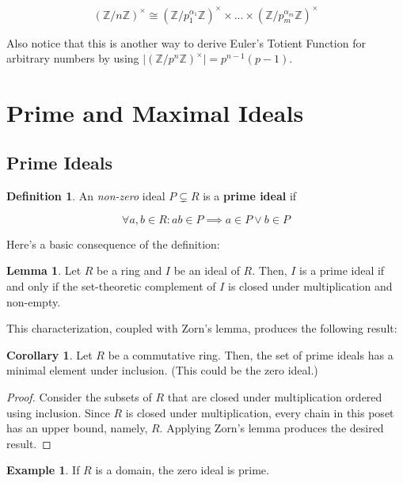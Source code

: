 \documentclass{article}
\theoremstyle{definition}
\newtheorem{definition}{Definition}
\newtheorem{lemma}[theorem]{Lemma}
\newtheorem{corollary}{Corollary}[theorem]
\newtheorem{example}[theorem]{Example}
\newcommand{\Z}{\mathbb{Z}}
\begin{document}
\[ (\Z / n\Z)^{\times} \cong  (\Z / p_{1}^{\alpha_{1}}\Z)^{\times} \times ... \times (\Z / p_{m}^{\alpha_{m}}\Z)^{\times}\]

Also notice that this is another way to derive Euler's Totient Function for
arbitrary numbers by using  $\lvert (\Z / p^{n}\Z)^{\times} \rvert = p^{n-1}(p - 1)$.



\newpage

\section{Prime and Maximal Ideals}

\subsection{Prime Ideals}

\begin{definition}
    An \textit{non-zero} ideal $P \subsetneq R$ is a \textbf{prime ideal} if 

    \[ \forall a,b \in R: ab \in P \implies a \in P \lor b \in P \]
\end{definition}

Here's a basic consequence of the definition:

\begin{lemma}
    Let $R$ be a ring and $I$ be an ideal of $R$. Then, $I$ is a prime ideal if and
    only if the set-theoretic complement of $I$ is closed under multiplication and
    non-empty.
\end{lemma}

This characterization, coupled with Zorn's lemma, produces the following result:

\begin{corollary}
    Let $R$ be a commutative ring. Then, the set of prime ideals has a minimal
    element under inclusion. (This could be the zero ideal.)
\end{corollary}
\begin{proof}
    Consider the subsets of $R$ that are closed under multiplication 
    ordered using inclusion. Since $R$ is closed under multiplication,
    every chain in this poset has an upper bound, namely, $R$. Applying
    Zorn's lemma produces the desired result.
\end{proof}

\begin{example}
    If $R$ is a domain, the zero ideal is prime.
\end{example}
\end{document}

